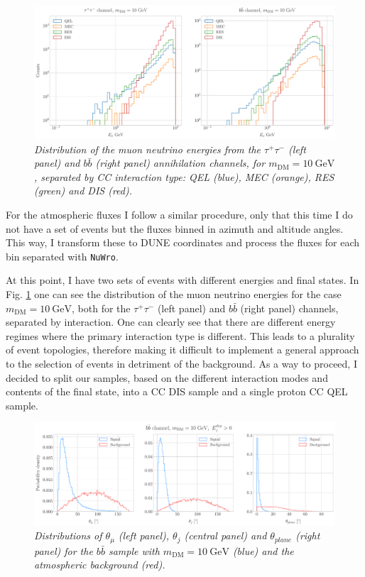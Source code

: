 \begin{figure}[t]
	\centering
	\includegraphics[width=1\linewidth]{Images/DM_Analysis/solardm_nu_mu_interactions.pdf}
	\caption{\textit{Distribution of the muon neutrino energies from the $\tau^{+} \tau^{-}$ (left panel) and $b\bar{b}$ (right panel) annihilation channels, for $m_{\mathrm{DM}} = 10 \ \mathrm{GeV}$, separated by CC interaction type: QEL (blue), MEC (orange), RES (green) and DIS (red).}}
	\label{fig:solardm_nu_mu_interactions}
\end{figure}

For the atmospheric fluxes I follow a similar procedure, only that this time I do not have a set of events but the fluxes binned in azimuth and altitude angles. This way, I transform these to DUNE coordinates and process the fluxes for each bin separated with \texttt{NuWro}.

At this point, I have two sets of events with different energies and final states. In Fig. \ref{fig:solardm_nu_mu_interactions} one can see the distribution of the muon neutrino energies for the case $m_{\mathrm{DM}} = 10 \ \mathrm{GeV}$, both for the $\tau^{+} \tau^{-}$ (left panel) and $b\bar{b}$ (right panel) channels, separated by interaction. One can clearly see that there are different energy regimes where the primary interaction type is different. This leads to a plurality of event topologies, therefore making it difficult to implement a general approach to the selection of events in detriment of the background. As a way to proceed, I decided to split our samples, based on the different interaction modes and contents of the final state, into a CC DIS sample and a single proton CC QEL sample.

\begin{figure}[t]
	\centering
	\includegraphics[width=0.95\linewidth]{Images/DM_Analysis/solardm_bb_100_dis_angular_dists.pdf}
	\caption{\textit{Distributions of $\theta_{\mu}$ (left panel), $\theta_{j}$ (central panel) and $\theta_{plane}$ (right panel) for the $b\bar{b}$ sample with $m_{\mathrm{DM}} = 10 \ \mathrm{GeV}$ (blue) and the atmospheric background (red).}}
	\label{fig:solardm_bb_100_dis_angular_dists}
\end{figure}

